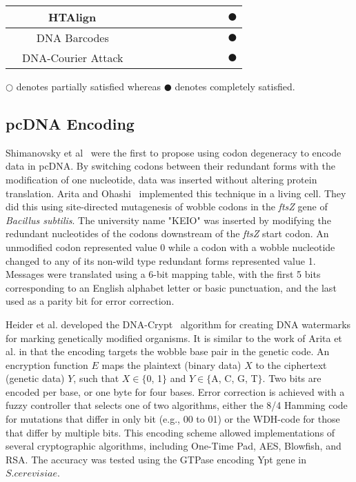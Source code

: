 \documentclass{bioinfo}
\begin{document}
\begin{table*}[t]
{\begin{tabular}{|c|c|c|c|c|c|c|c|c|c|c|}
		&HTAlign~\cite{HB2011IEEEICOBAB}  &  &  &\centering{$\CIRCLE$}  &  &\centering{$\Circle$}  &\centering{$\Circle$}  &  &  &$\CIRCLE$\\ \hline
		&DNA Barcodes~\cite{KS2015BMCB}  &\centering{$\CIRCLE$}  &  &\centering{$\CIRCLE$}  &  &\centering{$\CIRCLE$}  &\centering{$\CIRCLE$}  &  &  &$\CIRCLE$\\ \hline
		&DNA-Courier Attack~\cite{CLY2015SAPW}  &  &  &\centering{$\CIRCLE$}  &\centering{$\CIRCLE$}  &  &  &  &\centering{$\CIRCLE$}  &$\CIRCLE$\\ \hline
	\end{tabular}}
    \fontsize{7pt}{12pt}\selectfont
    \raggedright $\Circle$ denotes partially satisfied whereas $\CIRCLE$ denotes completely satisfied.
\end{table*}

\subsection{pcDNA Encoding}

Shimanovsky et al~\cite{SFHC2003BL} were the first to propose using codon degeneracy to encode data in pcDNA. By switching codons between their redundant forms with the modification of one nucleotide, data was inserted without altering protein translation. Arita and Ohashi~\cite{AY2004BP} implemented this technique in a living cell. They did this using site-directed mutagenesis of wobble codons in the \textit{ftsZ} gene of \textit{Bacillus subtilis}. The university name "KEIO" was inserted by modifying the redundant nucleotides of the codons downstream of the \textit{ftsZ} start codon. An unmodified codon represented value 0 while a codon with a wobble nucleotide changed to any of its non-wild type redundant forms represented value 1. Messages were translated using a 6-bit mapping table, with the first 5 bits corresponding to an English alphabet letter or basic punctuation, and the last used as a parity bit for error correction.

Heider et al. developed the DNA-Crypt~\cite{HBBMC2007} algorithm for creating DNA watermarks for marking genetically modified organisms. It is similar to the work of Arita et al. in that the encoding targets the wobble base pair in the genetic code. An encryption function $E$ maps the plaintext (binary data) $X$ to the ciphertext (genetic data) $Y$, such that $X \in  \{$0, 1$\}$ and $Y \in \{$A, C, G, T$\}$. Two bits are encoded per base, or one byte for four bases. Error correction is achieved with a fuzzy controller that selects one of two algorithms, either the 8/4 Hamming code for mutations that differ in only bit (e.g., 00 to 01) or the WDH-code for those that differ by multiple bits. This encoding scheme allowed implementations of several cryptographic algorithms, including One-Time Pad, AES, Blowfish, and RSA. The accuracy was tested using the GTPase encoding Ypt gene in $S. cerevisiae$.
\end{document}
